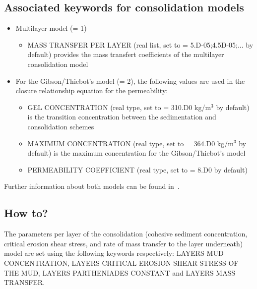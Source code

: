 \subsection{Associated keywords for consolidation models}
\begin{itemize}
\item Multilayer model ({\ttfamily = 1})
\begin{itemize}
\item {\ttfamily MASS TRANSFER PER LAYER} (real list, set to {\ttfamily = 5.D-05;4.5D-05;...} by default) provides the mass transfert coefficients of the multilayer consolidation model %
\end{itemize}
\item For the Gibson/Thiebot's model ({\ttfamily = 2}), the following values are used in the closure relationship equation for the permeability:
\begin{itemize}
\item {\ttfamily GEL CONCENTRATION} (real type, set to {\ttfamily = 310.D0} kg/m$^3$ by default) is the transition concentration between the sedimentation and consolidation schemes
\item {\ttfamily MAXIMUM CONCENTRATION} (real type, set to {\ttfamily = 364.D0} kg/m$^3$ by default) is the maximum concentration for the Gibson/Thiebot's model
\item {\ttfamily PERMEABILITY COEFFICIENT} (real type, set to {\ttfamily = 8.D0} by default) %
\end{itemize}
\end{itemize}

Further information about both models can be found in~\cite{Lan12}.

\subsection{How to?}
The parameters per layer of the consolidation (cohesive sediment concentration, critical erosion shear stress, and rate of mass transfer to the layer underneath) model are set using the following keywords respectively: {\ttfamily LAYERS MUD CONCENTRATION}, {\ttfamily LAYERS CRITICAL EROSION SHEAR STRESS OF THE MUD}, {\ttfamily LAYERS PARTHENIADES CONSTANT} and {\ttfamily LAYERS MASS TRANSFER}.

